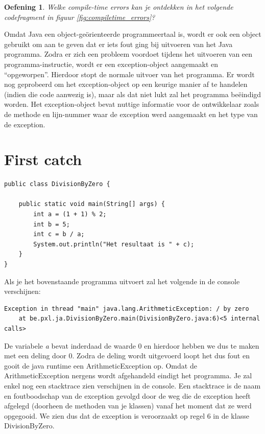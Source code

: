 \documentclass{tstextbook}
\newtheorem{envoefening}{Oefening}[chapter]
\newenvironment{oefening}
               {\begin{boxexercise}\begin{envoefening}}
               {\end{envoefening}\end{boxexercise}}
\begin{document}
\begin{oefening}
Welke compile-time errors kan je ontdekken in het volgende codefragment in figuur \ref{fig:compiletime_errors}?
\end{oefening}

Omdat Java een object-ge\"orienteerde programmeertaal is, wordt er ook een object gebruikt om aan te geven dat er iets fout ging bij uitvoeren van het Java programma. Zodra er zich een probleem voordoet tijdens het uitvoeren van een programma-instructie, wordt er een exception-object aangemaakt en ``opgeworpen''. Hierdoor stopt de normale uitvoer van het programma. Er wordt nog geprobeerd om het exception-object op een keurige manier af te handelen (indien die code aanwezig is), maar als dat niet lukt zal het programma be\"eindigd worden. Het exception-object bevat nuttige informatie voor de ontwikkelaar zoals de methode en lijn-nummer waar de exception werd aangemaakt en het type van de exception. 

\section{First catch}

\begin{lstlisting}
public class DivisionByZero {

	public static void main(String[] args) {
		int a = (1 + 1) % 2;
		int b = 5;
		int c = b / a;
		System.out.println("Het resultaat is " + c);
	}
}
\end{lstlisting}

Als je het bovenstaande programma uitvoert zal het volgende in de console verschijnen:

\begin{verbatim}
Exception in thread "main" java.lang.ArithmeticException: / by zero
	at be.pxl.ja.DivisionByZero.main(DivisionByZero.java:6)<5 internal calls>
\end{verbatim}
  
De variabele \textit{a} bevat inderdaad de waarde 0 en hierdoor hebben we dus te maken met een deling door 0. Zodra de deling wordt uitgevoerd loopt het dus fout en gooit de java runtime een ArithmeticException op. Omdat de ArithmeticException nergens wordt afgehandeld eindigt het programma. Je zal enkel nog een stacktrace zien verschijnen in de console. Een stacktrace is de naam en foutboodschap van de exception gevolgd door de weg die de exception heeft afgelegd (doorheen de methoden van je klassen) vanaf het moment dat ze werd opgegooid. We zien dus dat de exception is veroorzaakt op regel 6 in de klasse DivisionByZero.
\end{document}
